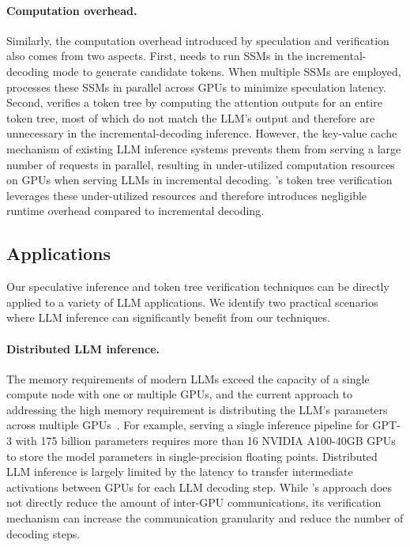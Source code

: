 \paragraph{Computation overhead.} Similarly, the computation overhead introduced by speculation and verification also comes from two aspects.
First, \SpecInfer needs to run SSMs in the incremental-decoding mode to generate candidate tokens. When multiple SSMs are employed, \SpecInfer processes these SSMs in parallel across GPUs to minimize speculation latency.
Second, \SpecInfer verifies a token tree by computing the attention outputs for an entire token tree, most of which do not match the LLM's output and therefore are unnecessary in the incremental-decoding inference.
However, the key-value cache mechanism of existing LLM inference systems prevents them from serving a large number of requests in parallel, resulting in under-utilized computation resources on GPUs when serving LLMs in incremental decoding. \SpecInfer's token tree verification leverages these under-utilized resources and therefore introduces negligible runtime overhead compared to incremental decoding.

\subsection{Applications}
\label{specinfer:subsec:application}
Our speculative inference and token tree verification techniques can be directly applied to a variety of LLM applications. We identify two practical scenarios where LLM inference can significantly benefit from our techniques.

\paragraph{Distributed LLM inference.}
The memory requirements of modern LLMs exceed the capacity of a single compute node with one or multiple GPUs, and the current approach to addressing the high memory requirement is distributing the LLM's parameters across multiple GPUs~\cite{miao2023spotserve}.
For example, serving a single inference pipeline for GPT-3 with 175 billion parameters requires more than 16 NVIDIA A100-40GB GPUs to store the model parameters in single-precision floating points.
Distributed LLM inference is largely limited by the latency to transfer intermediate activations between GPUs for each LLM decoding step.
While \SpecInfer's approach does not directly reduce the amount of inter-GPU communications, its verification mechanism can increase the communication granularity and reduce the number of decoding steps.

